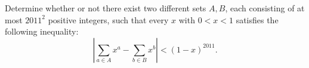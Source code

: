 Determine whether or not there exist two different sets $A,B$, each consisting of at most $2011^2$ positive integers, such that every $x$ with $0 < x < 1$ satisfies the following inequality: \[\left| \sum_{a \in A} x^a - \sum_{b \in B} x^b \right| < (1-x)^{2011}.\]